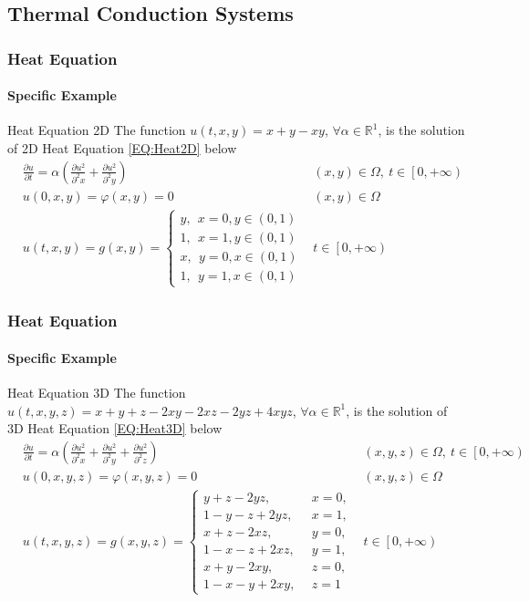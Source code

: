 \subsection{Thermal Conduction Systems}
\begin{frame}
  \frametitle{Heat Equation}
  \framesubtitle{Specific Example}
  \begin{block}{Heat Equation 2D}
    The function $u(t,x,y) = x + y - xy$, $\forall \alpha \in \mathbb{R}^1 $, is the solution of 2D Heat Equation \ref{EQ:Heat2D} below
    \begin{align}\label{EQ:Heat2D}
      &\frac{\partial u}{\partial t} = \alpha \left(
        \frac{\partial u^2}{\partial^2 x}
        +
        \frac{\partial u^2}{\partial^2 y}
      \right) &(x,y) \in \Omega, \: t \in \left[0, +\infty\right)  \nonumber\\
      &u(0,x,y)  = \varphi(x,y) = 0 &(x,y) \in \Omega\\
      &u(t,x,y)
       = g(x,y)
       = \begin{cases}
        y, \:\: x=0, y\in\left(0,1\right)\\
        1, \:\: x=1, y\in\left(0,1\right)\\
        x, \:\: y=0, x\in\left(0,1\right)\\
        1, \:\: y =1, x\in\left(0,1\right)
      \end{cases}
      &t \in \left[0, +\infty\right) \nonumber
    \end{align}
  \end{block}
\end{frame}


\begin{frame}
  \frametitle{Heat Equation}
  \framesubtitle{Specific Example}
  \begin{block}{Heat Equation 3D}
    The function $u(t,x,y,z) = x + y + z - 2xy - 2xz - 2yz + 4xyz$, $\forall \alpha \in \mathbb{R}^1 $, is the solution of 3D Heat Equation \ref{EQ:Heat3D} below
    \begin{align}\label{EQ:Heat3D}
      &\frac{\partial u}{\partial t} = \alpha \left(
        \frac{\partial u^2}{\partial^2 x}
        +
        \frac{\partial u^2}{\partial^2 y}
        +
        \frac{\partial u^2}{\partial^2 z}
      \right) & (x,y, z) \in \Omega, \: t \in \left[0, +\infty\right) 
                                                                      \nonumber\\
      &u(0,x,y,z)  = \varphi(x,y,z) = 0 &(x,y,z) \in \Omega\\
      &  u(t,x,y,z) = g(x,y,z) = 
      \begin{cases}
        y+z -2yz        , \:\: &x=0,\\
        1 - y - z + 2yz , \:\: &x=1,\\
        x+z - 2xz       , \:\: &y=0,\\
        1 - x - z + 2xz , \:\: &y =1,\\
        x+y - 2xy       , \:\: &z=0,\\
        1 - x - y + 2xy , \:\: &z=1
      \end{cases}
      &t \in \left[0, +\infty\right) \nonumber
    \end{align}
  \end{block}
\end{frame}
